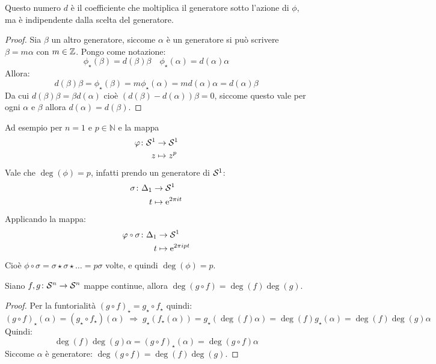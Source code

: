 \begin{osservation}
  Questo numero $ d $ è il coefficiente che moltiplica il generatore sotto
  l'azione di $ \phi $, ma è indipendente dalla scelta del generatore.
\end{osservation}
\begin{proof}
  Sia $ \beta $ un altro generatore, siccome $ \alpha $ è un generatore si può scrivere $ \beta = m \alpha $
  con $ m \in \mathbb{Z} $. Pongo come notazione:
  \[
    \phi_\star(\beta) = d(\beta) \beta \quad \phi_\star(\alpha) = d(\alpha) \alpha
  \]
  Allora:
  \[
    d(\beta) \beta = \phi_\star (\beta) = m \phi_\star (\alpha) = m d(\alpha) \alpha = d(\alpha) \beta
  \]
  Da cui $ d(\beta) \beta = \beta d(\alpha) $ cioè $ \left(d(\beta) - d(\alpha) \right) \beta = 0 $, siccome
  questo vale per ogni $ \alpha $ e $ \beta $ allora $ d(\alpha) = d(\beta) $.
\end{proof}

\begin{example}[$ n = 1 $]
  Ad esempio per $ n = 1 $ e $ p \in \mathbb{N} $ e la mappa
  \begin{align*}
    \varphi \colon  \mathcal{S}^{1} & \to  \mathcal{S}^{1} \\
    z   & \mapsto  z^p
  \end{align*}
  Vale che $ \deg{(\phi)} = p $, infatti prendo un generatore di $ \mathcal{S}^{1} $:
  \begin{align*}
    \sigma \colon \Delta_1 & \to \mathcal{S}^{1} \\
    t & \mapsto \mathrm{e}^{2 \pi i t}
  \end{align*}
  Applicando la mappa:
  \begin{align*}
    \phi \circ \sigma \colon \Delta_1 & \to \Sph{1} \\
    t & \mapsto \me^{2 \pi i p t}
  \end{align*}
  Cioè $ \phi \circ \sigma = \sigma \star \sigma \star \dots = p \sigma $ volte, e quindi $ \deg{(\phi)} = p $.
\end{example}

\begin{proposition}
  Siano $ f,g \colon \mathcal{S}^{n} \to \mathcal{S}^{n} $ mappe continue, allora $ \deg{(g \circ f)} = \deg{(f)} \deg{(g)} $.
\end{proposition}
\begin{proof}
  Per la funtorialità $ (g \circ f)_\star = g_\star \circ f_\star $ quindi:
  \[
    (g \circ f)_\star (\alpha) = (g_\star \circ f_\star)(\alpha) \; \Rightarrow \; g_\star (f_\star (\alpha)) = g_\star(\deg{(f)}\alpha) = \deg{(f)} g_\star(\alpha) = \deg{(f)}\deg{(g)}\alpha
  \]
  Quindi:
  \[
    \deg{(f)}\deg{(g)}\alpha = (g \circ f)_\star (\alpha) = \deg{(g \circ f)} \alpha
  \]
  Siccome $ \alpha $ è generatore: $ \deg{(g \circ f)} = \deg{(f)} \deg{(g)} $.
\end{proof}

